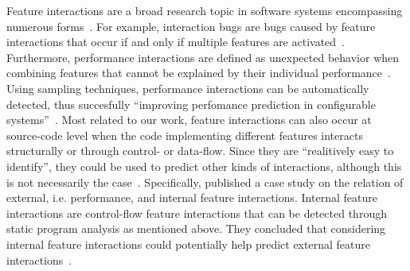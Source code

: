 Feature interactions are a broad research topic in software systems encompassing numerous forms~\cite{apel2014feature}.
For example, interaction bugs are bugs caused by feature interactions that occur if and only if multiple features are activated~\cite{nie2011survey}.
Furthermore, performance interactions are defined as unexpected behavior when combining features that cannot be explained by their individual performance~\cite{siegmund2012predicting}.
Using sampling techniques, performance interactions can be automatically detected, thus succesfully ``improving perfomance prediction in configurable systems''~\cite{apel2014feature}.
Most related to our work, feature interactions can also occur at source-code level when the code implementing different features interacts structurally or through control- or data-flow.
Since they are ``realitively easy to identify''\cite{apel2014feature}, they could be used to predict other kinds of interactions, although this is not necessarily the case~\cite{apel2014feature}.
Specifically, \citet{kolesnikov2017relation} published a case study on the relation of external, i.e. performance, and internal feature interactions.  
Internal feature interactions are control-flow feature interactions that can be detected through static program analysis as mentioned above. 
They concluded that considering internal feature interactions could potentially help predict external feature interactions~\cite{kolesnikov2017relation}.

